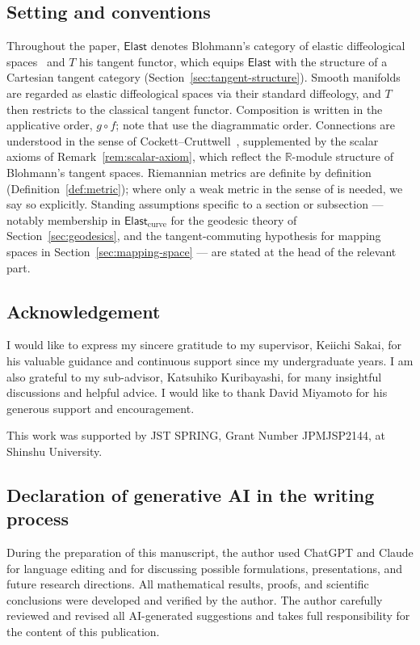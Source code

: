 \documentclass{amsart}
\newcommand{\R}{\mathbb{R}}
\theoremstyle{definition}
\begin{document}
\subsection*{Setting and conventions}
Throughout the paper, $\mathsf{Elast}$ denotes Blohmann's category of elastic diffeological spaces~\cite{B23} and $T$ his tangent functor, which equips $\mathsf{Elast}$ with the structure of a Cartesian tangent category (Section~\ref{sec:tangent-structure}). 
Smooth manifolds are regarded as elastic diffeological spaces via their standard diffeology, and $T$ then restricts to the classical tangent functor. Composition is written in the applicative order, $g \circ f$; note that \cite{CC17, CCL} use the diagrammatic order. Connections are understood in the sense of Cockett--Cruttwell~\cite{CC17}, supplemented by the scalar axioms of Remark~\ref{rem:scalar-axiom}, which reflect the $\R$-module structure of Blohmann's tangent spaces. 
Riemannian metrics are definite by definition (Definition~\ref{def:metric}); where only a weak metric in the sense of \cite{KSS} is needed, we say so explicitly. Standing assumptions specific to a section or subsection --- notably membership in $\mathsf{Elast}_{\mathrm{curve}}$ for the geodesic theory of Section~\ref{sec:geodesics}, and the tangent-commuting hypothesis for mapping spaces in Section~\ref{sec:mapping-space} --- are stated at the head of the relevant part.


\subsection*{Acknowledgement}
I would like to express my sincere gratitude to my supervisor, Keiichi Sakai, for his valuable guidance and continuous support since my undergraduate years. I am also grateful to my sub-advisor, Katsuhiko Kuribayashi, for many insightful discussions and helpful advice. I would like to thank David Miyamoto for his generous support and encouragement.

This work was supported by JST SPRING, Grant Number JPMJSP2144, at Shinshu University.

\subsection*{Declaration of generative AI in the writing process}
During the preparation of this manuscript, the author used ChatGPT and Claude for language editing and for discussing possible formulations, presentations, and future research directions. All mathematical results, proofs, and scientific conclusions were developed and verified by the author. The author carefully reviewed and revised all AI-generated suggestions and takes full responsibility for the content of this publication.
\end{document}
